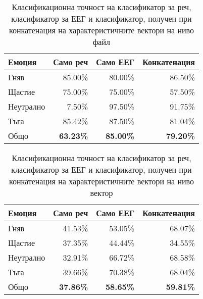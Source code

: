 \documentclass[main.tex]{subfiles}
\begin{document}
\begin{table}[h]
	\begin{center}
		\begin{tabular}{|l|r r r|}
			\hline
			Емоция    & Само реч         & Само ЕЕГ         & Конкатенация     \\
			\hline
			Гняв      & 85.00\%          & 80.00\%          & 86.50\%          \\
			Щастие    & 75.00\%          & 75.00\%          & 57.50\%          \\
			Неутрално & 7.50\%           & 97.50\%          & 91.75\%          \\
			Тъга      & 85.42\%          & 87.50\%          & 81.04\%          \\
			\hline
			\hline
			Общо      & \textbf{63.23\%} & \textbf{85.00\%} & \textbf{79.20\%} \\
			\hline
		\end{tabular}
		\caption{Класификационна точност на класификатор за реч, класификатор за ЕЕГ и класификатор, получен при конкатенация на характеристичните вектори на ниво файл}
		\label{tab:double:results:01}
	\end{center}
\end{table}

\begin{table}[h]
	\begin{center}
		\begin{tabular}{|l|r r r|}
			\hline
			Емоция    & Само реч         & Само ЕЕГ         & Конкатенация     \\
			\hline
			Гняв      & 41.53\%          & 53.05\%          & 68.07\%          \\
			Щастие    & 37.35\%          & 44.44\%          & 34.55\%          \\
			Неутрално & 32.91\%           & 66.72\%          & 68.58\%          \\
			Тъга      & 39.66\%          & 70.38\%          & 68.04\%          \\
			\hline
			\hline
			Общо      & \textbf{37.86\%} & \textbf{58.65\%} & \textbf{59.81\%} \\
			\hline
		\end{tabular}
		\caption{Класификационна точност на класификатор за реч, класификатор за ЕЕГ и класификатор, получен при конкатенация на характеристичните вектори на ниво вектор}
		\label{tab:double:results:04}
	\end{center}
\end{table}
\end{document}
